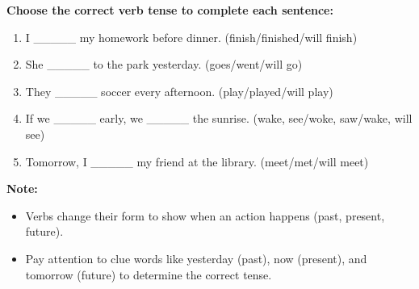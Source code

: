 \documentclass[12pt]{article}
\begin{document}
\vspace{1em}

\begin{tcolorbox}[colframe=black!60, colback=white, 
coltitle=black, colbacktitle=black!15, fonttitle=\bfseries\Large, 
title=Guided Practice, halign title=center, left=10pt, right=10pt, top=10pt, bottom=15pt]
\textbf{Choose the correct verb tense to complete each sentence:}
\begin{enumerate}[itemsep=3em]
    \item I \_\_\_\_\_ my homework before dinner. (finish/finished/will finish)
    \item She \_\_\_\_\_ to the park yesterday. (goes/went/will go)
    \item They \_\_\_\_\_ soccer every afternoon. (play/played/will play)
    \item If we \_\_\_\_\_ early, we \_\_\_\_\_ the sunrise. (wake, see/woke, saw/wake, will see)
    \item Tomorrow, I \_\_\_\_\_ my friend at the library. (meet/met/will meet)
\end{enumerate}
\end{tcolorbox}

\vspace{1em}

\begin{tcolorbox}[colframe=black!40, colback=gray!5, 
coltitle=black, colbacktitle=black!20, fonttitle=\bfseries\Large, 
title=Additional Notes, halign title=center, left=5pt, right=5pt, top=5pt, bottom=15pt]
\textbf{Note:}
\begin{itemize}
    \item Verbs change their form to show when an action happens (past, present, future).
    \item Pay attention to clue words like yesterday (past), now (present), and tomorrow (future) to determine the correct tense.
\end{itemize}
\end{tcolorbox}

\vspace{1em}
\end{document}
